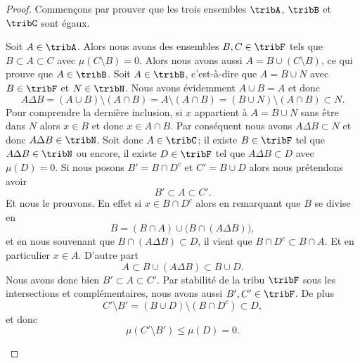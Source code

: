 \begin{proof}
	Commençons par prouver que les trois ensembles \( \tribA\), \( \tribB\) et \( \tribC\) sont égaux.
	\begin{subproof}
		Soit \( A\in\tribA\). Alors nous avons des ensembles \( B,C\in\tribF \) tels que \( B\subset A\subset C\) avec \( \mu(C\setminus B)=0\). Alors nous avons aussi \( A=B\cup(C\setminus B)\), ce qui prouve que \( A\in\tribB\).
		Soit \( A\in\tribB\), c'est-à-dire que \( A=B\cup N\) avec \( B\in\tribF\) et \( N\in\tribN\). Nous avons évidemment \( A\cup B=A\) et donc
		\begin{equation}
			A\Delta B=(A\cup B)\setminus(A\cap B)=A\setminus(A\cap B)=(B\cup N)\setminus(A\cap B)\subset N.
		\end{equation}
		Pour comprendre la dernière inclusion, si \( x\) appartient à \( A=B\cup N\) sans être dans \( N\) alors \( x\in B\) et donc \( x\in A\cap B\). Par conséquent nous avons \( A\Delta B\subset N\) et donc \( A\Delta B\in\tribN\).
		\spitem[\( \tribC\subset\tribA\)]
		Soit donc \( A\in\tribC\); il existe \( B\in\tribF\) tel que \( A\Delta B\in\tribN\) ou encore, il existe \( D\in\tribF\) tel que \( A\Delta B\subset D\) avec \( \mu(D)=0\). Si nous posons \( B'=B\cap D^c\) et \( C'=B\cup D\) alors nous prétendons avoir
		\begin{equation}
			B'\subset A\subset C'.
		\end{equation}
		Et nous le prouvons. En effet si \( x\in B\cap D^c\) alors en remarquant que \( B\) se divise en
		\begin{equation}
			B=(B\cap A)\cup\big(B\cap (A\Delta B)\big),
		\end{equation}
		et en nous souvenant que \( B\cap (A\Delta B)\subset D\), il vient que \( B\cap D^c\subset B\cap A\). Et en particulier \( x\in A\). D'autre part
		\begin{equation}
			A\subset B\cup(A\Delta B)\subset B\cup D.
		\end{equation}
		Nous avons donc bien \( B'\subset A\subset C'\). Par stabilité de la tribu \( \tribF\) sous les intersections et complémentaires, nous avons aussi \( B',C'\in\tribF\). De plus
		\begin{equation}
			C'\setminus B'=(B\cup D)\setminus(B\cap D^c)\subset D,
		\end{equation}
		et donc
		\begin{equation}
			\mu(C'\setminus B')\leq \mu(D)=0.
		\end{equation}
	\end{subproof}


\end{proof}
